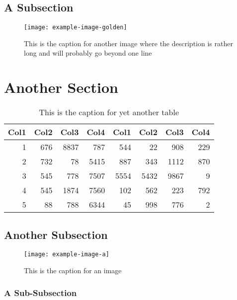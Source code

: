 \subsection{A Subsection}
    \lipsum[6-8]
    \begin{figure}
        \centering
        \texttt{[image: example-image-golden]}
        \caption{This is the caption for another image where the description is rather long and will probably go beyond one line}
    \end{figure}

\section{Another Section}
    \lipsum[1-2]
    \begin{table}
        \centering
        \begin{tabular}{r r r r r r r r}
             Col1 & Col2 & Col3 & Col4 & Col1 & Col2 & Col3 & Col4 \\
             \hline
             1    & 676  & 8837 & 787  & 544  & 22   & 908  & 229  \\
             2    & 732  & 78   & 5415 & 887  & 343  & 1112 & 870  \\
             3    & 545  & 778  & 7507 & 5554 & 5432 & 9867 & 9    \\
             4    & 545  & 1874 & 7560 & 102  & 562  & 223  & 792  \\
             5    & 88   & 788  & 6344 & 45   & 998  & 776  & 2    \\
             \hline
        \end{tabular}
        \caption{This is the caption for yet another table}
    \end{table}

\subsection{Another Subsection}
    \lipsum[3-5]
    \begin{figure}
        \centering
        \texttt{[image: example-image-a]}
        \caption{This is the caption for an image}
    \end{figure}

\subsubsection{A Sub-Subsection}
    \lipsum[6-8]
